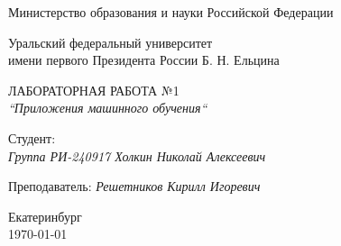 \thispagestyle{empty}

\begin{center}
	Министерство образования и науки Российской Федерации
	
	\vspace{20pt}
	
	Уральский федеральный университет \\
	имени первого Президента России Б. Н. Ельцина
	
	\vspace{20pt}

\end{center}

\vfill

\begin{center}
	ЛАБОРАТОРНАЯ РАБОТА №1 \\
	\textit{``Приложения машинного обучения``}
	
	\vspace{20pt}
\end{center}

\vfill

	\noindent Студент: \\
	\textit{Группа РИ-240917 \hfill Холкин Николай Алексеевич}
	
	\vspace{5pt}
	
	\noindent Преподаватель: 
	\textit{\hfill Решетников Кирилл Игоревич}
	
	\vspace{20pt}

\vfill

\begin{center}
	Екатеринбург \\ \today
\end{center}

\newpage